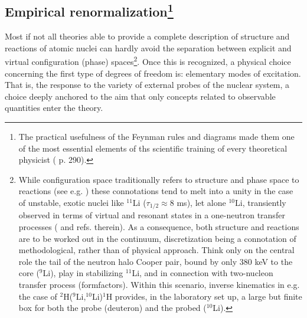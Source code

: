 \subsection[Empirical renormalization: (NFT)$_{\text{ren}}$(r+s) (Feynman + $S$--matrix)]{Empirical renormalization\footnote{The practical usefulness of the Feynman rules and diagrams made them one of the most essential elements of ths scientific training of every theoretical physicist (\cite{Mehra:96} p. 290).}} 
Most if not all theories able to provide a complete description of structure and reactions of atomic nuclei can hardly avoid the separation between explicit and virtual configuration (phase) spaces\footnote{While configuration space traditionally refers to structure and phase space to reactions (see e.g. \cite{Feshbach:62}) these connotations tend to melt into a unity in the case of unstable, exotic nuclei like $^{11}$Li ($\tau_{1/2}\approx 8$ ms), let alone $^{10}$Li, transiently observed in terms of virtual and resonant states in a one-neutron transfer processes (\cite{Cavallaro:17,Barranco:20} and refs. therein). As a consequence, both structure and reactions are to be worked out in the continuum, discretization being a connotation of methodological, rather than of physical approach. Think only on the central role the tail of the neutron halo Cooper pair, bound by only 380 keV to the core ($^9$Li), play in stabilizing $^{11}$Li, and in connection with two-nucleon transfer process (formfactors). Within this scenario, inverse kinematics in e.g. the case of $^2$H($^9$Li,$^{10}$Li)$^1$H provides, in the laboratory set up, a large but finite box for both the probe (deuteron) and the probed ($^{10}$Li).}. Once this is recognized, a physical choice concerning the first type of degrees of freedom is: elementary modes of excitation. That is, the response to the variety of external probes of the nuclear system, a choice deeply anchored to the aim that only concepts related to observable quantities enter the theory.


